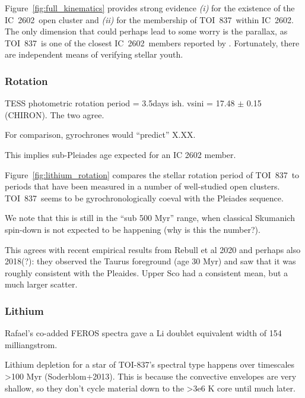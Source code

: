 \documentclass[12pt,twocolumn,tighten]{aastex62}
\newcommand{\tn}{TOI~837} %
\newcommand{\cn}{IC~2602} %
\begin{document}
Figure~\ref{fig:full_kinematics} provides strong evidence {\it (i)} for the
existence of the \cn\ open cluster and {\it (ii)} for the membership
of \tn\ within \cn.
The only dimension that could perhaps lead to some worry is the
parallax, as \tn\ is one of the closest \cn\ members reported by
\citet{cantatgaudin_gaia_2018}.
Fortunately, there are independent means of verifying stellar youth.


\subsubsection{Rotation}

TESS photometric rotation period = 3.5days ish.
vsini = 17.48 $\pm$ 0.15 (CHIRON).
The two agree.

For comparison, gyrochrones would ``predict'' X.XX.

This implies sub-Pleiades age expected for an IC 2602 member.

Figure~\ref{fig:lithium_rotation} compares the stellar rotation period of \tn\ to
periods that have been measured in a number of well-studied open clusters.
\tn\ seems to be gyrochronologically coeval with the Pleiades sequence.

We note that this is still in the ``sub 500 Myr'' range, when classical
Skumanich spin-down is not expected to be happening (why is this the number?).

This agrees with recent empirical results from Rebull et al 2020 and perhaps also 2018(?):
they observed the Taurus foreground (age 30 Myr) and saw that it was 
roughly consistent with the Pleaides.
Upper Sco had a consistent mean, but a much larger scatter.



\subsubsection{Lithium}

Rafael's co-added FEROS spectra gave a Li doublet equivalent width of
154 milliangstrom.

Lithium depletion for a star of TOI-837's spectral type happens
over timescales >100 Myr (Soderblom+2013). This is because the
convective envelopes are very shallow, so they don't cycle material
down to the >3e6 K core until much later.
\end{document}
